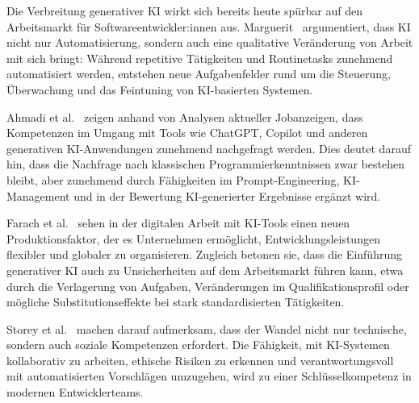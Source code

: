 Die Verbreitung generativer KI wirkt sich bereits heute spürbar auf den
Arbeitsmarkt für Softwareentwickler:innen aus.
Marguerit~\cite{marguerit_augmenting_2025} argumentiert, dass KI nicht nur
Automatisierung, sondern auch eine qualitative Veränderung von Arbeit mit sich
bringt: Während repetitive Tätigkeiten und Routinetasks zunehmend automatisiert
werden, entstehen neue Aufgabenfelder rund um die Steuerung, Überwachung und
das Feintuning von KI-basierten Systemen.

Ahmadi et al.~\cite{ahmadi_generative_2024} zeigen anhand von Analysen
aktueller Jobanzeigen, dass Kompetenzen im Umgang mit Tools wie ChatGPT,
Copilot und anderen generativen KI-Anwendungen zunehmend nachgefragt werden.
Dies deutet darauf hin, dass die Nachfrage nach klassischen
Programmierkenntnissen zwar bestehen bleibt, aber zunehmend durch Fähigkeiten
im Prompt-Engineering, KI-Management und in der Bewertung KI-generierter
Ergebnisse ergänzt wird.

Farach et al.~\cite{farach_evolving_2025} sehen in der digitalen Arbeit mit
KI-Tools einen neuen Produktionsfaktor, der es Unternehmen ermöglicht,
Entwicklungsleistungen flexibler und globaler zu organisieren. Zugleich betonen
sie, dass die Einführung generativer KI auch zu Unsicherheiten auf dem
Arbeitsmarkt führen kann, etwa durch die Verlagerung von Aufgaben,
Veränderungen im Qualifikationsprofil oder mögliche Substitutionseffekte bei
stark standardisierten Tätigkeiten.

Storey et al.~\cite{storey_generative_2025} machen darauf aufmerksam, dass der
Wandel nicht nur technische, sondern auch soziale Kompetenzen erfordert. Die
Fähigkeit, mit KI-Systemen kollaborativ zu arbeiten, ethische Risiken zu
erkennen und verantwortungsvoll mit automatisierten Vorschlägen umzugehen, wird
zu einer Schlüsselkompetenz in modernen Entwicklerteams.

